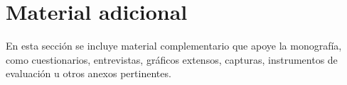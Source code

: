 \chapter{Material adicional}

En esta sección se incluye material complementario que apoye la monografía, como cuestionarios, entrevistas, gráficos extensos, capturas, instrumentos de evaluación u otros anexos pertinentes.
